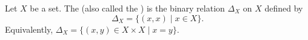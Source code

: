 \begin{definition} \label{definition:diagonal_relation_on_a_set}
Let $X$ be a set. The  (also called the ) is the binary relation $\Delta_X$ on $X$ defined by
$$
\Delta_X = \{ (x, x) \mid x \in X \}.
$$
Equivalently, $\Delta_X = \{ (x, y) \in X \times X \mid x = y \}$.
\end{definition}